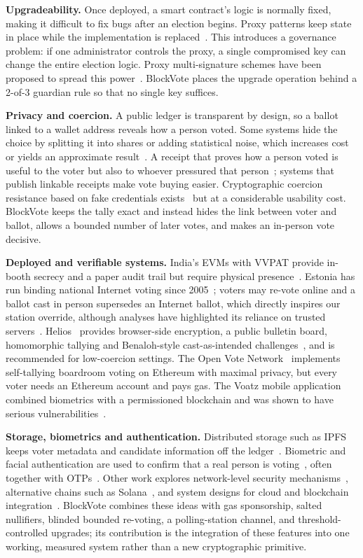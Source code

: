 \documentclass[conference]{IEEEtran}
\begin{document}
\textbf{Upgradeability.} Once deployed, a smart contract's logic is normally fixed, making it difficult to fix bugs after an election begins. Proxy patterns keep state in place while the implementation is replaced~\cite{saim2022,eip1822}. This introduces a governance problem: if one administrator controls the proxy, a single compromised key can change the entire election logic. Proxy multi-signature schemes have been proposed to spread this power~\cite{luo2021}. BlockVote places the upgrade operation behind a 2-of-3 guardian rule so that no single key suffices.

\textbf{Privacy and coercion.} A public ledger is transparent by design, so a ballot linked to a wallet address reveals how a person voted. Some systems hide the choice by splitting it into shares or adding statistical noise, which increases cost or yields an approximate result~\cite{beydili2025,baniata2025}. A receipt that proves how a person voted is useful to the voter but also to whoever pressured that person~\cite{chaum2004}; systems that publish linkable receipts make vote buying easier. Cryptographic coercion resistance based on fake credentials exists~\cite{juels2005} but at a considerable usability cost. BlockVote keeps the tally exact and instead hides the link between voter and ballot, allows a bounded number of later votes, and makes an in-person vote decisive.

\textbf{Deployed and verifiable systems.} India's EVMs with VVPAT provide in-booth secrecy and a paper audit trail but require physical presence~\cite{eci_evm}. Estonia has run binding national Internet voting since 2005~\cite{madise2006}; voters may re-vote online and a ballot cast in person supersedes an Internet ballot, which directly inspires our station override, although analyses have highlighted its reliance on trusted servers~\cite{springall2014}. Helios~\cite{adida2008} provides browser-side encryption, a public bulletin board, homomorphic tallying and Benaloh-style cast-as-intended challenges~\cite{benaloh2006}, and is recommended for low-coercion settings. The Open Vote Network~\cite{mccorry2017} implements self-tallying boardroom voting on Ethereum with maximal privacy, but every voter needs an Ethereum account and pays gas. The Voatz mobile application combined biometrics with a permissioned blockchain and was shown to have serious vulnerabilities~\cite{specter2020}.

\textbf{Storage, biometrics and authentication.} Distributed storage such as IPFS keeps voter metadata and candidate information off the ledger~\cite{saha2025,somasekhar2024}. Biometric and facial authentication are used to confirm that a real person is voting~\cite{deepika2017,parmar2021,faruk2022,sujatha2024}, often together with OTPs~\cite{parmar2021,kalaiselvi2024}. Other work explores network-level security mechanisms~\cite{wu2018}, alternative chains such as Solana~\cite{chavan2024}, and system designs for cloud and blockchain integration~\cite{hjalmarsson2018,kshetri2018}. BlockVote combines these ideas with gas sponsorship, salted nullifiers, blinded bounded re-voting, a polling-station channel, and threshold-controlled upgrades; its contribution is the integration of these features into one working, measured system rather than a new cryptographic primitive.
\end{document}
